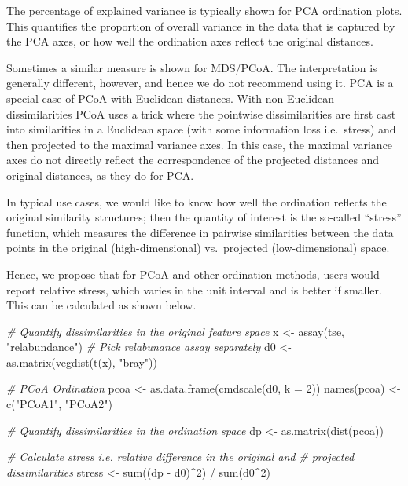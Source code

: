 \documentclass[
]{book}
\newenvironment{Shaded}{\begin{snugshade}}{\end{snugshade}}
\newcommand{\AttributeTok}[1]{\textcolor[rgb]{0.77,0.63,0.00}{#1}}
\newcommand{\CommentTok}[1]{\textcolor[rgb]{0.56,0.35,0.01}{\textit{#1}}}
\newcommand{\DecValTok}[1]{\textcolor[rgb]{0.00,0.00,0.81}{#1}}
\newcommand{\FunctionTok}[1]{\textcolor[rgb]{0.00,0.00,0.00}{#1}}
\newcommand{\NormalTok}[1]{#1}
\newcommand{\OtherTok}[1]{\textcolor[rgb]{0.56,0.35,0.01}{#1}}
\newcommand{\SpecialCharTok}[1]{\textcolor[rgb]{0.00,0.00,0.00}{#1}}
\newcommand{\StringTok}[1]{\textcolor[rgb]{0.31,0.60,0.02}{#1}}
\begin{document}
The percentage of explained variance is typically shown for PCA
ordination plots. This quantifies the proportion of overall variance
in the data that is captured by the PCA axes, or how well the
ordination axes reflect the original distances.

Sometimes a similar measure is shown for MDS/PCoA. The interpretation
is generally different, however, and hence we do not recommend using
it. PCA is a special case of PCoA with Euclidean distances. With
non-Euclidean dissimilarities PCoA uses a trick where the pointwise
dissimilarities are first cast into similarities in a Euclidean space
(with some information loss i.e.~stress) and then projected to the
maximal variance axes. In this case, the maximal variance axes do not
directly reflect the correspondence of the projected distances and
original distances, as they do for PCA.

In typical use cases, we would like to know how well the ordination
reflects the original similarity structures; then the quantity of
interest is the so-called ``stress'' function, which measures the
difference in pairwise similarities between the data points in the
original (high-dimensional) vs.~projected (low-dimensional) space.

Hence, we propose that for PCoA and other ordination methods, users
would report relative stress, which varies in the unit interval and is better
if smaller. This can be calculated as shown below.

\begin{Shaded}
\begin{Highlighting}[]
\CommentTok{\# Quantify dissimilarities in the original feature space}
\NormalTok{x }\OtherTok{\textless{}{-}} \FunctionTok{assay}\NormalTok{(tse, }\StringTok{"relabundance"}\NormalTok{) }\CommentTok{\# Pick relabunance assay separately}
\NormalTok{d0 }\OtherTok{\textless{}{-}} \FunctionTok{as.matrix}\NormalTok{(}\FunctionTok{vegdist}\NormalTok{(}\FunctionTok{t}\NormalTok{(x), }\StringTok{"bray"}\NormalTok{))}

\CommentTok{\# PCoA Ordination}
\NormalTok{pcoa }\OtherTok{\textless{}{-}} \FunctionTok{as.data.frame}\NormalTok{(}\FunctionTok{cmdscale}\NormalTok{(d0, }\AttributeTok{k =} \DecValTok{2}\NormalTok{))}
\FunctionTok{names}\NormalTok{(pcoa) }\OtherTok{\textless{}{-}} \FunctionTok{c}\NormalTok{(}\StringTok{"PCoA1"}\NormalTok{, }\StringTok{"PCoA2"}\NormalTok{)}

\CommentTok{\# Quantify dissimilarities in the ordination space}
\NormalTok{dp }\OtherTok{\textless{}{-}} \FunctionTok{as.matrix}\NormalTok{(}\FunctionTok{dist}\NormalTok{(pcoa))}

\CommentTok{\# Calculate stress i.e. relative difference in the original and}
\CommentTok{\# projected dissimilarities}
\NormalTok{stress }\OtherTok{\textless{}{-}} \FunctionTok{sum}\NormalTok{((dp }\SpecialCharTok{{-}}\NormalTok{ d0)}\SpecialCharTok{\^{}}\DecValTok{2}\NormalTok{) }\SpecialCharTok{/} \FunctionTok{sum}\NormalTok{(d0}\SpecialCharTok{\^{}}\DecValTok{2}\NormalTok{)}
\end{Highlighting}
\end{Shaded}
\end{document}
